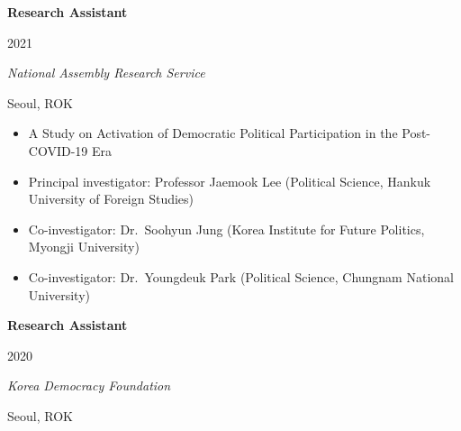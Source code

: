 \documentclass[
  16,
]{article}
\providecommand{\tightlist}{%
  \setlength{\itemsep}{0pt}\setlength{\parskip}{0pt}}\usepackage{longtable,booktabs,array}
\begin{document}
\vspace{7pt}

\begin{large}
  \begin{multicols}{2}
    \begin{flushleft}{\bf Research Assistant}\end{flushleft}
    \begin{flushright}2021\end{flushright}
  \end{multicols}
  \vspace{-0.17cm}
  \begin{multicols}{2}
    \begin{flushleft}\textit{National Assembly Research Service}\end{flushleft}
    \begin{flushright}Seoul, ROK\end{flushright}
  \end{multicols}
  \end{large}
\vspace{-0.16cm}

\begin{itemize}
\tightlist
\item
  A Study on Activation of Democratic Political Participation in the
  Post-COVID-19 Era
\item
  Principal investigator: Professor Jaemook Lee (Political Science,
  Hankuk University of Foreign Studies)
\item
  Co-investigator: Dr.~Soohyun Jung (Korea Institute for Future
  Politics, Myongji University)
\item
  Co-investigator: Dr.~Youngdeuk Park (Political Science, Chungnam
  National University)
\end{itemize}

\vspace{7pt}
\newpage

\begin{large}
  \begin{multicols}{2}
    \begin{flushleft}{\bf Research Assistant}\end{flushleft}
    \begin{flushright}2020\end{flushright}
  \end{multicols}
  \vspace{-0.17cm}
  \begin{multicols}{2}
    \begin{flushleft}\textit{Korea Democracy Foundation}\end{flushleft}
    \begin{flushright}Seoul, ROK\end{flushright}
  \end{multicols}
  \end{large}
\vspace{-0.16cm}
\end{document}
